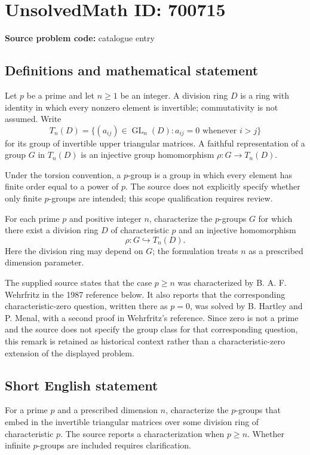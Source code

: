 \documentclass[11pt]{article}
\begin{document}
\section*{UnsolvedMath ID: 700715}
\textbf{Source problem code:} catalogue entry
\subsection{Definitions and mathematical statement}
Let \(p\) be a prime and let \(n\geq 1\) be an integer. A division ring \(D\) is a ring with identity in which every nonzero element is invertible; commutativity is not assumed. Write
\[
T_n(D)=\{(a_{ij})\in\operatorname{GL}_n(D):a_{ij}=0\text{ whenever }i>j\}
\]
for its group of invertible upper triangular matrices. A faithful representation of a group \(G\) in \(T_n(D)\) is an injective group homomorphism \(\rho:G\to T_n(D)\).

Under the torsion convention, a \(p\)-group is a group in which every element has finite order equal to a power of \(p\). The source does not explicitly specify whether only finite \(p\)-groups are intended; this scope qualification requires review.

For each prime \(p\) and positive integer \(n\), characterize the \(p\)-groups \(G\) for which there exist a division ring \(D\) of characteristic \(p\) and an injective homomorphism
\[
\rho:G\hookrightarrow T_n(D).
\]
Here the division ring may depend on \(G\); the formulation treats \(n\) as a prescribed dimension parameter.

The supplied source states that the case \(p\geq n\) was characterized by B. A. F. Wehrfritz in the 1987 reference below. It also reports that the corresponding characteristic-zero question, written there as \(p=0\), was solved by B. Hartley and P. Menal, with a second proof in Wehrfritz's reference. Since zero is not a prime and the source does not specify the group class for that corresponding question, this remark is retained as historical context rather than a characteristic-zero extension of the displayed problem.
\subsection{Short English statement}
For a prime \(p\) and a prescribed dimension \(n\), characterize the \(p\)-groups that embed in the invertible triangular matrices over some division ring of characteristic \(p\). The source reports a characterization when \(p\geq n\). Whether infinite \(p\)-groups are included requires clarification.
\end{document}
